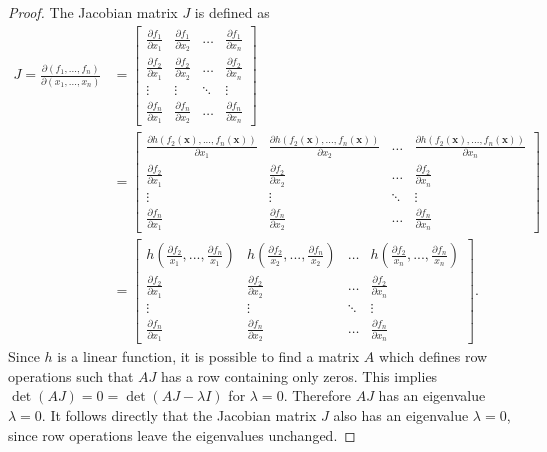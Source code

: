 \begin{proof}
	The Jacobian matrix $J$ is defined as
	\begin{equation*}
	\begin{aligned}
	J = \frac{\partial (f_1,...,f_n)}{\partial (x_1,...,x_n)}
	&=  
	\begin{bmatrix}
	\frac{\partial f_1}{\partial x_1} &
	\frac{\partial f_1}{\partial x_2} &
	\dots & 
	\frac{\partial f_1}{\partial x_n} \\[1ex] %
	\frac{\partial f_2}{\partial x_1} &
	\frac{\partial f_2}{\partial x_2} &
	\dots & 
	\frac{\partial f_2}{\partial x_n} \\[1ex] %
	\vdots & 
	\vdots &
	\ddots & 
	\vdots \\[1ex]
	\frac{\partial f_n}{\partial x_1} &
	\frac{\partial f_n}{\partial x_2} &
	\dots & 
	\frac{\partial f_n}{\partial x_n}
	\end{bmatrix}\\[1ex]
	&=  
	\begin{bmatrix}
	\frac{\partial h(f_2(\bm{x}), ..., f_n(\bm{x}))}{\partial x_1} &
	\frac{\partial h(f_2(\bm{x}), ..., f_n(\bm{x}))}{\partial x_2} &
	\dots & 
	\frac{\partial h(f_2(\bm{x}), ..., f_n(\bm{x}))}{\partial x_n} \\[1ex] %
	\frac{\partial f_2}{\partial x_1} &
	\frac{\partial f_2}{\partial x_2} &
	\dots & 
	\frac{\partial f_2}{\partial x_n} \\[1ex] %
	\vdots & 
	\vdots &
	\ddots & 
	\vdots \\[1ex]
	\frac{\partial f_n}{\partial x_1} &
	\frac{\partial f_n}{\partial x_2} &
	\dots & 
	\frac{\partial f_n}{\partial x_n}
	\end{bmatrix}\\[1ex]
	&=  
	\begin{bmatrix}
	h\left( \frac{\partial f_2}{x_1},...,\frac{\partial f_n}{x_1} \right) &
	h\left( \frac{\partial f_2}{x_2},...,\frac{\partial f_n}{x_2} \right) &
	\dots & 
	h\left( \frac{\partial f_2}{x_n},...,\frac{\partial f_n}{x_n} \right) \\[1ex] %
	\frac{\partial f_2}{\partial x_1} &
	\frac{\partial f_2}{\partial x_2} &
	\dots & 
	\frac{\partial f_2}{\partial x_n} \\[1ex] %
	\vdots & 
	\vdots &
	\ddots & 
	\vdots \\[1ex]
	\frac{\partial f_n}{\partial x_1} &
	\frac{\partial f_n}{\partial x_2} &
	\dots & 
	\frac{\partial f_n}{\partial x_n}
	\end{bmatrix}.
	\end{aligned}
	\end{equation*}
	Since $h$ is a linear function, it is possible to find a matrix $A$ which defines row operations such that $A J $ has a row containing only zeros. This implies $\det(AJ) = 0 = \det(AJ-\lambda I)$ for $\lambda=0$. Therefore $AJ$ has an eigenvalue $\lambda=0$. It follows directly that the Jacobian matrix $J$ also has an eigenvalue $\lambda=0$, since row operations leave the eigenvalues unchanged.
\end{proof}

